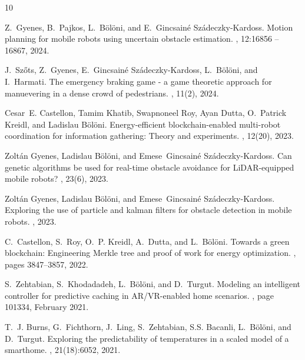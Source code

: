 \begin{thebibliography}{10}

Z.~Gyenes, B.~Pajkos, L.~Bölöni, and E.~Gincsainé Szádeczky-Kardoss.
\newblock Motion planning for mobile robots using uncertain obstacle
  estimation.
, 12:16856 -- 16867, 2024.

J.~Szőts, Z.~Gyenes, E.~Gincsainé Szádeczky-Kardoss, L.~Bölöni, and
  I.~Harmati.
\newblock The emergency braking game - a game theoretic approach for
  manuevering in a dense crowd of pedestrians.
, 11(2), 2024.

Cesar~E. Castellon, Tamim Khatib, Swapnoneel Roy, Ayan Dutta, O.~Patrick
  Kreidl, and Ladislau B{\"o}l{\"o}ni.
\newblock Energy-efficient blockchain-enabled multi-robot coordination for
  information gathering: {T}heory and experiments.
, 12(20), 2023.

Zoltán Gyenes, Ladislau Bölöni, and Emese~Gincsainé Szádeczky-Kardoss.
\newblock Can genetic algorithms be used for real-time obstacle avoidance for
  {LiDAR}-equipped mobile robots?
, 23(6), 2023.

Zoltán Gyenes, Ladislau Bölöni, and Emese~Gincsainé Szádeczky-Kardoss.
\newblock Exploring the use of particle and kalman filters for obstacle
  detection in mobile robots.
, 2023.

C.~Castellon, S.~Roy, O.~P. Kreidl, A.~Dutta, and L.~Bölöni.
\newblock Towards a green blockchain: Engineering {Merkle} tree and proof of
  work for energy optimization.
, pages 3847--3857,
  2022.

S.~Zehtabian, S.~Khodadadeh, L.~Bölöni, and D.~Turgut.
\newblock Modeling an intelligent controller for predictive caching in
  {AR/VR}-enabled home scenarios.
, page 101334, February
  2021.

T.~J. Burns, G.~Fichthorn, J.~Ling, S.~Zehtabian, S.S. Bacanli,
  L.~B{\"o}l{\"o}ni, and D.~Turgut.
\newblock Exploring the predictability of temperatures in a scaled model of a
  smarthome.
, 21(18):6052, 2021.


\end{thebibliography}
